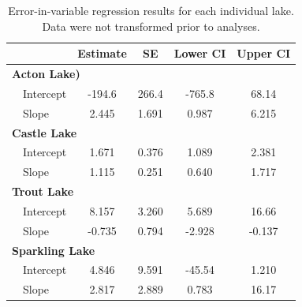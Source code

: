 \documentclass[12pt, oneside]{article}
\begin{document}
\newpage
\begin{table}[h]
\centering
\begin{threeparttable}
\caption{Error-in-variable regression results for each individual lake. Data were not transformed prior to analyses.}
\label{tab:table3}
\begin{tabular}{@{}llcccc@{}}
\toprule
            &    & Estimate  & SE    & Lower CI  & Upper CI  \\ \midrule
\multicolumn{6}{l}{\bf{Acton Lake)}} \\
& Intercept       & -194.6     & 266.4 & -765.8    & 68.14  \\
& Slope           & 2.445     & 1.691 & 0.987     & 6.215 \\
\multicolumn{6}{l}{\bf{Castle Lake}} \\
& Intercept       & 1.671     & 0.376 & 1.089    & 2.381  \\
& Slope           & 1.115     & 0.251 & 0.640     & 1.717 \\
\multicolumn{6}{l}{\bf{Trout Lake}} \\
& Intercept       & 8.157     & 3.260 & 5.689    & 16.66  \\
& Slope           & -0.735     & 0.794 & -2.928     & -0.137 \\
\multicolumn{6}{l}{\bf{Sparkling Lake}} \\
& Intercept       & 4.846     & 9.591 & -45.54    & 1.210  \\
& Slope           & 2.817     & 2.889 & 0.783     & 16.17 \\
 \bottomrule
\end{tabular}
\end{threeparttable}
\end{table} %
\end{document}
